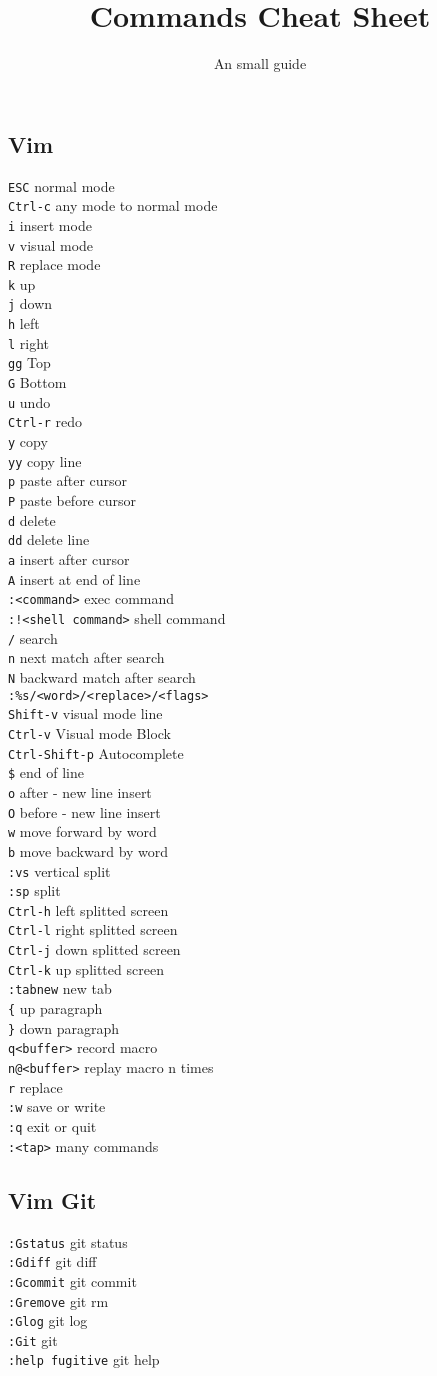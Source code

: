 \documentclass{article}
\title{\vspace{-1.5cm} Commands Cheat Sheet}
\author{An small guide}
\date{}
\begin{document}
\newcommand{\command}[2]{
  \texttt{#1} \hfill #2 \\
}

\begin{multicols*}{4}
\maketitle
\section*{Vim}
\command{ESC}{normal mode}
\command{Ctrl-c}{any mode to normal mode}
\command{i}{insert mode}
\command{v}{visual mode}
\command{R}{replace mode}
\command{k}{up}
\command{j}{down}
\command{h}{left}
\command{l}{right}
\command{gg}{Top}
\command{G}{Bottom}
\command{u}{undo}
\command{Ctrl-r}{redo}
\command{y}{copy}
\command{yy}{copy line}
\command{p}{paste after cursor}
\command{P}{paste before cursor}
\command{d}{delete}
\command{dd}{delete line}
\command{a}{insert after cursor}
\command{A}{insert at end of line}
\command{:<command>}{exec command}
\command{:!<shell command>}{shell command}
\command{/}{search}
\command{n}{next match after search}
\command{N}{backward match after search}
\command{:\%s/<word>/<replace>/<flags>}{}
\command{Shift-v}{visual mode line}
\command{Ctrl-v}{Visual mode Block}
\command{Ctrl-Shift-p}{Autocomplete}
\command{\$}{end of line}
\command{o}{after - new line insert}
\command{O}{before - new line insert}
\command{w}{move forward by word}
\command{b}{move backward by word}
\command{:vs}{vertical split}
\command{:sp}{split}
\command{Ctrl-h}{left splitted screen}
\command{Ctrl-l}{right splitted screen}
\command{Ctrl-j}{down splitted screen}
\command{Ctrl-k}{up splitted screen}
\command{:tabnew}{new tab}
\command{\{}{up paragraph}
\command{\}}{down paragraph}
\command{q<buffer>}{record macro}
\command{n@<buffer>}{replay macro n times}
\command{r}{replace}
\command{:w}{save or write}
\command{:q}{exit or quit}
\command{:<tap>}{many commands}
\subsection*{Vim Git}
\command{:Gstatus}{git status}
\command{:Gdiff}{git diff}
\command{:Gcommit}{git commit}
\command{:Gremove}{git rm}
\command{:Glog}{git log}
\command{:Git}{git}
\command{:help fugitive}{git help}

\end{multicols*}
\end{document}
